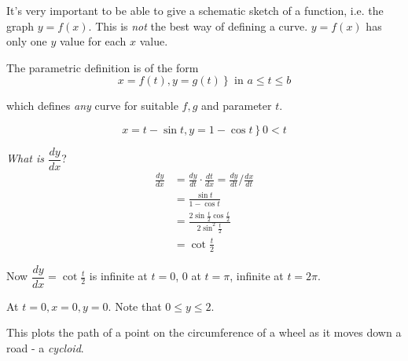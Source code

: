 \documentclass[twoside]{scrartcl}
\begin{document}

It's very important to be able to give a schematic sketch of a function, i.e. the graph $y = f(x)$. This is \emph{not} the best way of defining a curve. $y = f(x)$ has only one $y$ value for each $x$ value. 

\begin{center}
\end{center}


\vspace*{5pt}


\begin{definition}
The parametric definition is of the form
\[\left. x = f(t), y= g(t) \right\} \text{ in } a \leq t \leq b\]

which defines \emph{any} curve for suitable $f,g$ and parameter $t$.
\end{definition}\vspace*{5pt}

\begin{example}
\[\left. x = t-\sin t, y = 1-\cos t\right\} 0 < t\]	

\emph{What is $\dfrac{dy}{dx}$}? 
\[
\begin{aligned}
  \frac{dy}{dx} &= \frac{dy}{dt} \cdot \frac{dt}{dx} = \frac{dy}{dt} / \frac{dx}{dt}\\
  &= \frac{\sin t}{1-\cos t}\\
  &= \frac{2\sin\frac{t}{2}\cos\frac{t}{2}}{2\sin^2\frac{t}{2}}\\
  &= \cot \frac{t}{2}
\end{aligned}
\]

Now $\dfrac{dy}{dx} = \cot\frac{t}{2}$ is infinite at $t = 0$, $0$ at $t = \pi$, infinite at $t = 2\pi$. 

At $t = 0, x = 0, y = 0$. Note that $0 \leq y \leq 2$. 


This plots the path of a point on the circumference of a wheel as it moves down a road - a \emph{cycloid}. 

\end{example}
\end{document}
